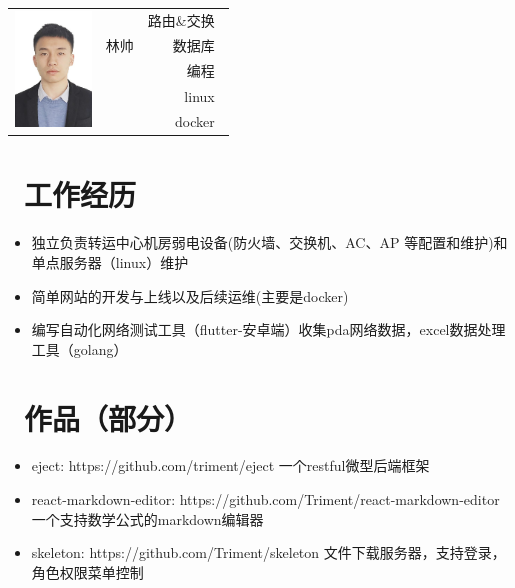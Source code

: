 \documentclass{resume}
\begin{document}

\Large{
  \begin{tabu}{ c l r }
     &  & {路由\&交换~} \\
    & \scshape{林帅} & {数据库~} \\
    &  & {编程~} \\
    &  & {linux~} \\
    &  & {docker~}
  \end{tabu}
}
 
\section{\faUsers\ 工作经历}
\begin{itemize}
  \item 独立负责转运中心机房弱电设备(防火墙、交换机、AC、AP 等配置和维护)和单点服务器（linux）维护
  \item 简单网站的开发与上线以及后续运维(主要是docker)
  \item 编写自动化网络测试工具（flutter-安卓端）收集pda网络数据，excel数据处理工具（golang）
\end{itemize}

\section{\faGithub\ 作品（部分）}
\begin{itemize}[parsep=0.5ex]
  \item eject: https://github.com/triment/eject 一个restful微型后端框架~
  \item react-markdown-editor: https://github.com/Triment/react-markdown-editor 一个支持数学公式的markdown编辑器~
  \item skeleton: https://github.com/Triment/skeleton 文件下载服务器，支持登录，角色权限菜单控制~
\end{itemize}
\end{document}
